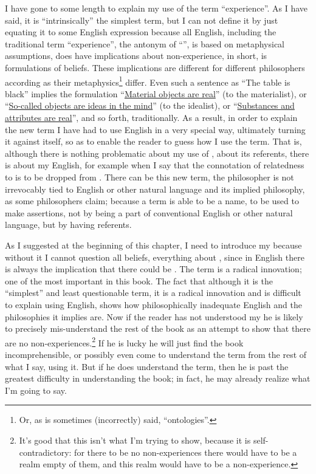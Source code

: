 I have gone to some length to explain my use of the term \enquote{experience}. As I have said, it is \enquote{intrinsically} the simplest term, but I can not define it by just equating it to some English expression because all English, including the traditional term \enquote{experience}, the antonym of \enquote{}, is based on metaphysical assumptions, does have implications about non-experience, in short, is formulations of beliefs. These implications are different for different philosophers according as their metaphysics\footnote{Or, as is sometimes (incorrectly) said, \enquote{ontologies}.} differ. Even such a sentence as \enquote{The table is black} implies the formulation \enquote{\uline{Material objects are real}} (to the materialist), or \enquote{\uline{So-called objects are ideas in the mind}} (to the idealist), or \enquote{\uline{Substances and attributes are real}}, and so forth, traditionally. As a result, in order to explain the new term I have had to use English in a very special way, ultimately turning it against itself, so as to enable the reader to guess how I use the term. That is, although there is nothing problematic about my use of , about its referents, there is about my English, for example when I say that the connotation of relatedness to  is to be dropped from . There can be this new term, the philosopher is not irrevocably tied to English or other natural language and its implied philosophy, as some philosophers claim; because a term is able to be a name, to be used to make assertions, not by being a part of conventional English or other natural language, but by having referents. 

As I suggested at the beginning of this chapter, I need to introduce my  because without it I cannot question all beliefs, everything about , since in English there is always the implication that there could be . The term is a radical innovation; one of the most important in this book. The fact that although it is the \enquote{simplest} and least questionable term, it is a radical innovation and is difficult to explain using English, shows how philosophically inadequate English and the philosophies it implies are. Now if the reader has not understood my  he is likely to precisely mis-understand the rest of the book as an attempt to show that there are no non-experiences.\footnote{It's good that this isn't what I'm trying to show, because it is self-contradictory: for there to be no non-experiences there would have to be a realm empty of them, and this realm would have to be a non-experience.} If he is lucky he will just find the book incomprehensible, or possibly even come to understand the term from the rest of what I say, using it. But if he does understand the term, then he is past the greatest difficulty in understanding the book; in fact, he may already realize what I'm going to say. 



